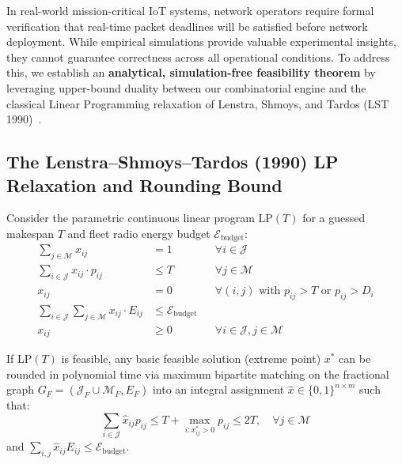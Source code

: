 \documentclass{article}
\begin{document}
In real-world mission-critical IoT systems, network operators require formal verification that real-time packet deadlines will be satisfied before network deployment. While empirical simulations provide valuable experimental insights, they cannot guarantee correctness across all operational conditions. To address this, we establish an \textbf{analytical, simulation-free feasibility theorem} by leveraging upper-bound duality between our combinatorial engine and the classical Linear Programming relaxation of Lenstra, Shmoys, and Tardos (LST 1990)~\cite{lenstra1990approximation}.

\subsection{The Lenstra--Shmoys--Tardos (1990) LP Relaxation and Rounding Bound}
Consider the parametric continuous linear program $\text{LP}(T)$ for a guessed makespan $T$ and fleet radio energy budget $\mathcal{E}_{\text{budget}}$:
\begin{align}
\sum_{j \in \mathcal{M}} x_{ij} &= 1 && \forall i \in \mathcal{J} \label{eq:lp_assign} \\
\sum_{i \in \mathcal{J}} x_{ij} \cdot p_{ij} &\le T && \forall j \in \mathcal{M} \label{eq:lp_load} \\
x_{ij} &= 0 && \forall (i, j) \text{ with } p_{ij} > T \text{ or } p_{ij} > D_i \label{eq:lp_prune} \\
\sum_{i \in \mathcal{J}} \sum_{j \in \mathcal{M}} x_{ij} \cdot E_{ij} &\le \mathcal{E}_{\text{budget}} \label{eq:lp_energy} \\
x_{ij} &\ge 0 && \forall i \in \mathcal{J}, j \in \mathcal{M}
\end{align}

\begin{theorem}
\label{thm:lst_rounding}
If $\text{LP}(T)$ is feasible, any basic feasible solution (extreme point) $x^*$ can be rounded in polynomial time via maximum bipartite matching on the fractional graph $G_F = (\mathcal{J}_F \cup \mathcal{M}_F, E_F)$ into an integral assignment $\hat{x} \in \{0, 1\}^{n \times m}$ such that:
\begin{equation}
\sum_{i \in \mathcal{J}} \hat{x}_{ij} p_{ij} \le T + \max_{i: x^*_{ij} > 0} p_{ij} \le 2T, \quad \forall j \in \mathcal{M}
\end{equation}
and $\sum_{i,j} \hat{x}_{ij} E_{ij} \le \mathcal{E}_{\text{budget}}$.
\end{theorem}
\end{document}
